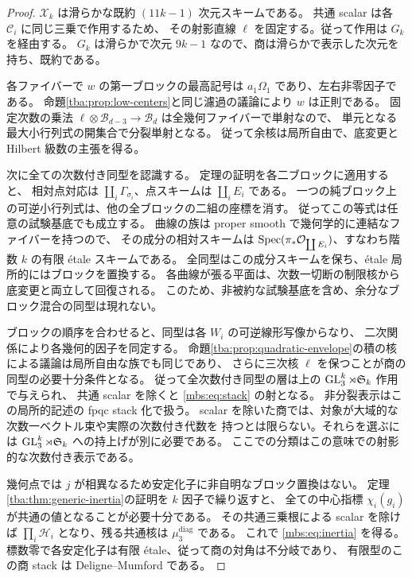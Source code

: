 \begin{proof}
$\mathcal X_k$ は滑らかな既約 $(11k-1)$ 次元スキームである。
共通 scalar は各 $\mathcal C_i$ に同じ三乗で作用するため、
その射影直線 $\ell$ を固定する。従って作用は $G_k$ を経由する。
$G_k$ は滑らかで次元 $9k-1$ なので、商は滑らかで表示した次元を持ち、既約である。

各ファイバーで $w$ の第一ブロックの最高記号は
$a_1\Omega_1$ であり、左右非零因子である。
命題\ref{tba:prop:low-centers}と同じ濾過の議論により $w$ は正則である。
固定次数の乗法
$\ell\otimes\mathcal B_{d-3}\to\mathcal B_d$ は全幾何ファイバーで単射なので、
単元となる最大小行列式の開集合で分裂単射となる。
従って余核は局所自由で、底変更と Hilbert 級数の主張を得る。

次に全ての次数付き同型を認識する。
定理の証明を各二ブロックに適用すると、
相対点対応は $\coprod_i\Gamma_{\sigma_i}$、点スキームは $\coprod_iE_i$ である。
一つの純ブロック上の可逆小行列式は、他の全ブロックの二組の座標を消す。
従ってこの等式は任意の試験基底でも成立する。
曲線の族は proper smooth で幾何学的に連結なファイバーを持つので、
その成分の相対スキームは
$\operatorname{Spec}(\pi_*\mathcal O_{\coprod E_i})$、すなわち階数 $k$ の有限 \'etale スキームである。
全同型はこの成分スキームを保ち、\'etale 局所的にはブロックを置換する。
各曲線が張る平面は、次数一切断の制限核から底変更と両立して回復される。
このため、非被約な試験基底を含め、余分なブロック混合の同型は現れない。

ブロックの順序を合わせると、同型は各 $W_i$ の可逆線形写像からなり、
二次関係により各幾何的因子を同定する。
命題\ref{tba:prop:quadratic-envelope}の積の核による議論は局所自由な族でも同じであり、
さらに三次核 $\ell$ を保つことが商の同型の必要十分条件となる。
従って全次数付き同型の層は上の $\operatorname{GL}_3^k\rtimes\mathfrak S_k$ 作用で与えられ、
共通 scalar を除くと \eqref{mbs:eq:stack} の射となる。
非分裂表示はこの局所的記述の fpqc stack 化で扱う。
scalar を除いた商では、対象が大域的な次数一ベクトル束や実際の次数付き代数を
持つとは限らない。それらを選ぶには
$\operatorname{GL}_3^k\rtimes\mathfrak S_k$ への持上げが別に必要である。
ここでの分類はこの意味での射影的な次数付き表示である。

幾何点では $j$ が相異なるため安定化子に非自明なブロック置換はない。
定理\ref{tba:thm:generic-inertia}の証明を $k$ 因子で繰り返すと、
全ての中心指標 $\chi_i(g_i)$ が共通の値となることが必要十分である。
その共通三乗根による scalar を除けば
$\prod_i\mathcal H_i$ となり、残る共通核は $\mu_3^{\mathrm{diag}}$ である。
これで \eqref{mbs:eq:inertia} を得る。
標数零で各安定化子は有限 \'etale、従って商の対角は不分岐であり、
有限型のこの商 stack は Deligne--Mumford である。
\end{proof}

